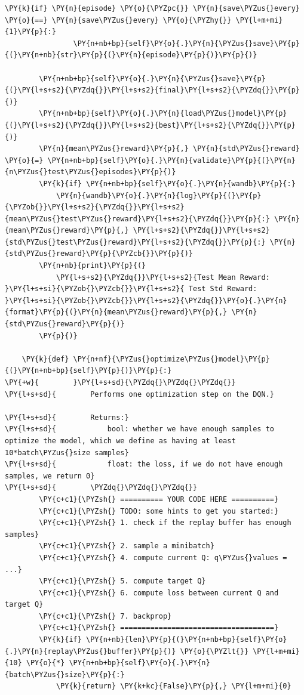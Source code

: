 \documentclass{article}
\begin{document}
\begin{Verbatim}[commandchars=\\\{\}]
            \PY{k}{if} \PY{n}{episode} \PY{o}{\PYZpc{}} \PY{n}{save\PYZus{}every} \PY{o}{==} \PY{n}{save\PYZus{}every} \PY{o}{\PYZhy{}} \PY{l+m+mi}{1}\PY{p}{:}
                \PY{n+nb+bp}{self}\PY{o}{.}\PY{n}{\PYZus{}save}\PY{p}{(}\PY{n+nb}{str}\PY{p}{(}\PY{n}{episode}\PY{p}{)}\PY{p}{)}

        \PY{n+nb+bp}{self}\PY{o}{.}\PY{n}{\PYZus{}save}\PY{p}{(}\PY{l+s+s2}{\PYZdq{}}\PY{l+s+s2}{final}\PY{l+s+s2}{\PYZdq{}}\PY{p}{)}
        \PY{n+nb+bp}{self}\PY{o}{.}\PY{n}{load\PYZus{}model}\PY{p}{(}\PY{l+s+s2}{\PYZdq{}}\PY{l+s+s2}{best}\PY{l+s+s2}{\PYZdq{}}\PY{p}{)}
        \PY{n}{mean\PYZus{}reward}\PY{p}{,} \PY{n}{std\PYZus{}reward} \PY{o}{=} \PY{n+nb+bp}{self}\PY{o}{.}\PY{n}{validate}\PY{p}{(}\PY{n}{n\PYZus{}test\PYZus{}episodes}\PY{p}{)}
        \PY{k}{if} \PY{n+nb+bp}{self}\PY{o}{.}\PY{n}{wandb}\PY{p}{:}
            \PY{n}{wandb}\PY{o}{.}\PY{n}{log}\PY{p}{(}\PY{p}{\PYZob{}}\PY{l+s+s2}{\PYZdq{}}\PY{l+s+s2}{mean\PYZus{}test\PYZus{}reward}\PY{l+s+s2}{\PYZdq{}}\PY{p}{:} \PY{n}{mean\PYZus{}reward}\PY{p}{,} \PY{l+s+s2}{\PYZdq{}}\PY{l+s+s2}{std\PYZus{}test\PYZus{}reward}\PY{l+s+s2}{\PYZdq{}}\PY{p}{:} \PY{n}{std\PYZus{}reward}\PY{p}{\PYZcb{}}\PY{p}{)}
        \PY{n+nb}{print}\PY{p}{(}
            \PY{l+s+s2}{\PYZdq{}}\PY{l+s+s2}{Test Mean Reward: }\PY{l+s+si}{\PYZob{}\PYZcb{}}\PY{l+s+s2}{ Test Std Reward: }\PY{l+s+si}{\PYZob{}\PYZcb{}}\PY{l+s+s2}{\PYZdq{}}\PY{o}{.}\PY{n}{format}\PY{p}{(}\PY{n}{mean\PYZus{}reward}\PY{p}{,} \PY{n}{std\PYZus{}reward}\PY{p}{)}
        \PY{p}{)}

    \PY{k}{def} \PY{n+nf}{\PYZus{}optimize\PYZus{}model}\PY{p}{(}\PY{n+nb+bp}{self}\PY{p}{)}\PY{p}{:}
\PY{+w}{        }\PY{l+s+sd}{\PYZdq{}\PYZdq{}\PYZdq{}}
\PY{l+s+sd}{        Performs one optimization step on the DQN.}

\PY{l+s+sd}{        Returns:}
\PY{l+s+sd}{            bool: whether we have enough samples to optimize the model, which we define as having at least 10*batch\PYZus{}size samples}
\PY{l+s+sd}{            float: the loss, if we do not have enough samples, we return 0}
\PY{l+s+sd}{        \PYZdq{}\PYZdq{}\PYZdq{}}
        \PY{c+c1}{\PYZsh{} ========== YOUR CODE HERE ==========}
        \PY{c+c1}{\PYZsh{} TODO: some hints to get you started:}
        \PY{c+c1}{\PYZsh{} 1. check if the replay buffer has enough samples}
        \PY{c+c1}{\PYZsh{} 2. sample a minibatch}
        \PY{c+c1}{\PYZsh{} 4. compute current Q: q\PYZus{}values = ...}
        \PY{c+c1}{\PYZsh{} 5. compute target Q}
        \PY{c+c1}{\PYZsh{} 6. compute loss between current Q and target Q}
        \PY{c+c1}{\PYZsh{} 7. backprop}
        \PY{c+c1}{\PYZsh{} ====================================}
        \PY{k}{if} \PY{n+nb}{len}\PY{p}{(}\PY{n+nb+bp}{self}\PY{o}{.}\PY{n}{replay\PYZus{}buffer}\PY{p}{)} \PY{o}{\PYZlt{}} \PY{l+m+mi}{10} \PY{o}{*} \PY{n+nb+bp}{self}\PY{o}{.}\PY{n}{batch\PYZus{}size}\PY{p}{:}
            \PY{k}{return} \PY{k+kc}{False}\PY{p}{,} \PY{l+m+mi}{0}


\end{Verbatim}
\end{document}
